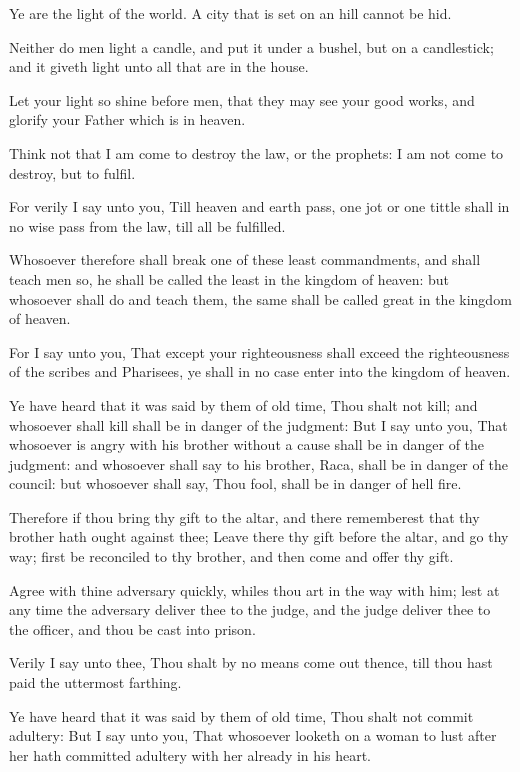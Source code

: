 \verse Ye are the light of the world. A city that is set on an hill cannot be hid.

\verse Neither do men light a candle, and put it under a bushel, but on a candlestick; and it giveth light unto all that are in the house.

\verse Let your light so shine before men, that they may see your good works, and glorify your Father which is in heaven.

\verse Think not that I am come to destroy the law, or the prophets: I am not come to destroy, but to fulfil.

\verse For verily I say unto you, Till heaven and earth pass, one jot or one tittle shall in no wise pass from the law, till all be fulfilled.

\verse Whosoever therefore shall break one of these least commandments, and shall teach men so, he shall be called the least in the kingdom of heaven: but whosoever shall do and teach them, the same shall be called great in the kingdom of heaven.

\verse For I say unto you, That except your righteousness shall exceed the righteousness of the scribes and Pharisees, ye shall in no case enter into the kingdom of heaven.

\verse Ye have heard that it was said by them of old time, Thou shalt not kill; and whosoever shall kill shall be in danger of the judgment: \verse But I say unto you, That whosoever is angry with his brother without a cause shall be in danger of the judgment: and whosoever shall say to his brother, Raca, shall be in danger of the council: but whosoever shall say, Thou fool, shall be in danger of hell fire.

\verse Therefore if thou bring thy gift to the altar, and there rememberest that thy brother hath ought against thee; \verse Leave there thy gift before the altar, and go thy way; first be reconciled to thy brother, and then come and offer thy gift.

\verse Agree with thine adversary quickly, whiles thou art in the way with him; lest at any time the adversary deliver thee to the judge, and the judge deliver thee to the officer, and thou be cast into prison.

\verse Verily I say unto thee, Thou shalt by no means come out thence, till thou hast paid the uttermost farthing.

\verse Ye have heard that it was said by them of old time, Thou shalt not commit adultery: \verse But I say unto you, That whosoever looketh on a woman to lust after her hath committed adultery with her already in his heart.

